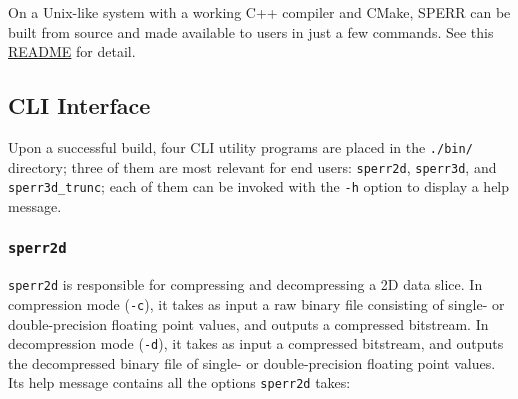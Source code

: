 \documentclass{article}
\newcommand{\callout}[1]{\begin{BlueBox}#1\end{BlueBox}}
\begin{document}
\callout{On a Unix-like system with a working C++ compiler and CMake, SPERR can be
built from source and made available to users in just a few commands.
See this \href{https://github.com/NCAR/SPERR?tab=readme-ov-file\#quick-build}{README} 
for detail.}


\subsection{CLI Interface}
\label{sec:cli}
Upon a successful build, four CLI utility programs are placed in the \texttt{./bin/}
directory; three of them are most relevant for end users: \texttt{sperr2d}, 
\texttt{sperr3d}, and \texttt{sperr3d\_trunc};
each of them can be invoked with the \texttt{-h} option to display a help message.

\subsubsection{\texttt{sperr2d}}
\texttt{sperr2d} is responsible for compressing and decompressing a 2D data slice.
In compression mode (\texttt{-c}), it takes as input a raw binary file consisting of 
single- or double-precision floating point values, and outputs a compressed bitstream.
In decompression mode (\texttt{-d}), it takes as input a compressed bitstream, and
outputs the decompressed binary file of single- or double-precision floating point values.
Its help message contains all the options \texttt{sperr2d} takes:
\end{document}

